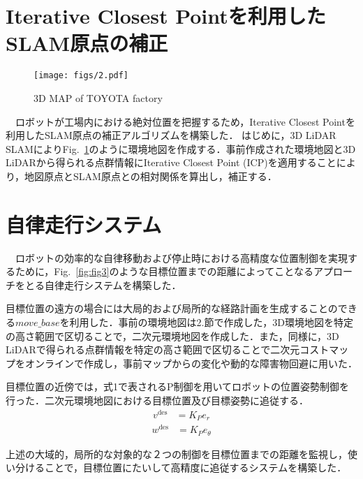 \section{Iterative Closest Pointを利用したSLAM原点の補正}

\begin{figure}[h]
\texttt{[image: figs/2.pdf]}
\caption{3D MAP of TOYOTA factory}
\label{fig:fig2}
\end{figure}

　ロボットが工場内における絶対位置を把握するため，Iterative Closest Point\cite{ICP}を利用したSLAM原点の補正アルゴリズムを構築した．
はじめに，3D LiDAR SLAMによりFig.~\ref{fig:fig2}のように環境地図を作成する．事前作成された環境地図と3D LiDARから得られる点群情報にIterative Closest Point (ICP)を適用することにより，地図原点とSLAM原点との相対関係を算出し，補正する．

\section{自律走行システム}
　ロボットの効率的な自律移動および停止時における高精度な位置制御を実現するために，Fig.~\ref{fig:fig3}のような目標位置までの距離によってことなるアプローチをとる自律走行システムを構築した．

目標位置の遠方の場合には大局的および局所的な経路計画を生成することのできる$move\_base$\cite{move_base}を利用した．事前の環境地図は2.節で作成した，3D環境地図を特定の高さ範囲で区切ることで，二次元環境地図を作成した．また，同様に，3D LiDARで得られる点群情報を特定の高さ範囲で区切ることで二次元コストマップをオンラインで作成し，事前マップからの変化や動的な障害物回避に用いた．

目標位置の近傍では，式1で表されるP制御を用いてロボットの位置姿勢制御を行った．二次元環境地図における目標位置及び目標姿勢に追従する．
\begin{align}
v^{\text{des}} &= K_{P} e_{r} %
\end{align}
\begin{align}
w^{\text{des}} &= K_{P} e_{θ} %
\end{align}

上述の大域的，局所的な対象的な２つの制御を目標位置までの距離を監視し，使い分けることで，目標位置にたいして高精度に追従するシステムを構築した．

